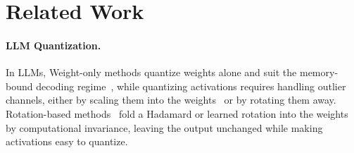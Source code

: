 \section{Related Work}
\label{sec:related}
\vspace{-2mm}

\paragraph{LLM Quantization.}
In LLMs, Weight-only methods quantize weights alone and suit the memory-bound decoding regime~\cite{frantar2022gptq, lin2024awq, kim2023squeezellm, dettmers2023spqr}, while quantizing activations requires handling outlier channels, either by scaling them into the weights~\cite{xiao2023smoothquant} or by rotating them away. Rotation-based methods~\cite{ashkboos2024quarot, liu2025spinquant, chee2023quip, tseng2024quip, sun2024flatquant, hu2025ostquant} fold a Hadamard or learned rotation into the weights by computational invariance, leaving the output unchanged while making activations easy to quantize. 

